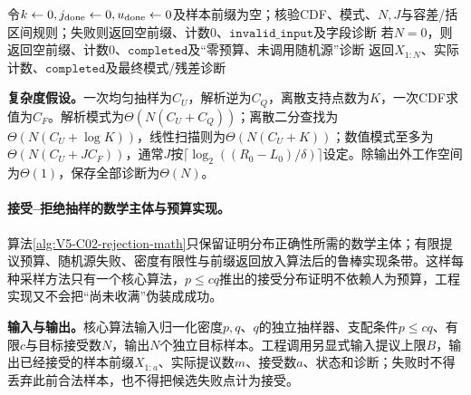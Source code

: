\begin{AlgorithmContract}
\begin{algorithm}[!t]
令$k\leftarrow0,j_{\rm done}\leftarrow0,u_{\rm done}\leftarrow0$及样本前缀为空；核验CDF、模式、$N,J$与容差/括区间规则；失败则返回空前缀、计数$0$、$\mathtt{invalid\_input}$及字段诊断\;
若$N=0$，则返回空前缀、计数$0$、$\mathtt{completed}$及“零预算、未调用随机源”诊断\;
返回$X_{1:N}$、实际计数、$\mathtt{completed}$及最终模式/残差诊断\;
\end{algorithm}
\end{AlgorithmContract}
\endgroup

\textbf{复杂度假设。}一次均匀抽样为$C_U$，解析逆为$C_Q$，离散支持点数为$K$，一次CDF求值为$C_F$。解析模式为$\Theta(N(C_U+C_Q))$；离散二分查找为$\Theta(N(C_U+\log K))$，线性扫描则为$\Theta(N(C_U+K))$；数值模式至多为$\Theta(N(C_U+J C_F))$，通常$J$按$\lceil\log_2((R_0-L_0)/\delta)\rceil$设定。除输出外工作空间为$\Theta(1)$，保存全部诊断为$\Theta(N)$。

\paragraph{接受--拒绝抽样的数学主体与预算实现。}
算法\ref{alg:V5-C02-rejection-math}只保留证明分布正确性所需的数学主体；有限提议预算、随机源失败、密度有限性与前缀返回放入算法后的鲁棒实现条带。这样每种采样方法只有一个核心算法，$p\le cq$推出的接受分布证明不依赖人为预算，工程实现又不会把“尚未收满”伪装成成功。

\textbf{输入与输出。}核心算法输入归一化密度$p,q$、$q$的独立抽样器、支配条件$p\le cq$、有限$c$与目标接受数$N$，输出$N$个独立目标样本。工程调用另显式输入提议上限$B$，输出已经接受的样本前缀$X_{1:a}$、实际提议数$m$、接受数$a$、状态和诊断；失败时不得丢弃此前合法样本，也不得把候选失败点计为接受。

